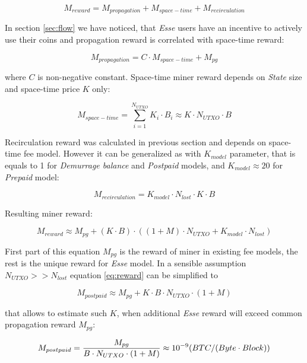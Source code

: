 \documentclass[]{article}   %
\newcommand{\esse}{\textit{Esse}}
\newcommand{\state}{\textit{State}}
\begin{document}
\begin{equation}
M_{reward} = M_{propagation} + M_{space-time} + M_{recirculation}
\end{equation}

In section \ref{sec:flow} we have noticed, that \esse{} users have an incentive to actively use their coins and propagation reward is correlated with space-time reward:

\begin{equation}
M_{propagation} = C \cdot M_{space-time} + M_{pg}
\end{equation}

where $C$ is non-negative constant. Space-time miner reward depends on \state{} size and space-time price $K$ only:

\begin{equation}
M_{space-time} = \sum_{i=1}^{N_{UTXO}} K_i \cdot B_i \approx K \cdot N_{UTXO} \cdot B
\end{equation}

Recirculation reward was calculated in previous section and depends on space-time fee model. However it can be generalized as with $K_{model}$ parameter, that is equals to 1 for \textit{Demurrage balance} and \textit{Postpaid} models, and $K_{model} \approx 20$ for \textit{Prepaid} model:

\begin{equation}
M_{recirculation} = {K_{model} \cdot  N_{lost} \cdot K \cdot B}
\end{equation}

Resulting miner reward:

\begin{equation}
\label{eq:reward}
M_{reward} \approx M_{pg} + (K \cdot B) \cdot ((1 + M) \cdot N_{UTXO} + K_{model} \cdot N_{lost})
\end{equation}

First part of this equation $M_{pg}$ is the reward of miner in existing fee models, the rest is the unique reward for \esse{} model.  In a sensible assumption $N_{UTXO} >> N_{lost}$ equation \ref{eq:reward} can be simplified to

\begin{equation}
M_{postpaid} \approx M_{pg} + K \cdot B \cdot N_{UTXO} \cdot (1 + M)
\end{equation}

that allows to estimate such $K$, when additional \esse{} reward will exceed common propagation reward $M_{pg}$:

\begin{equation}
M_{postpaid} = {M_{pg} \over B \cdot N_{UTXO} \cdot (1 + M)} \approx 10^{-9} ({BTC / (Byte \cdot Block)})
\end{equation}
\end{document}
